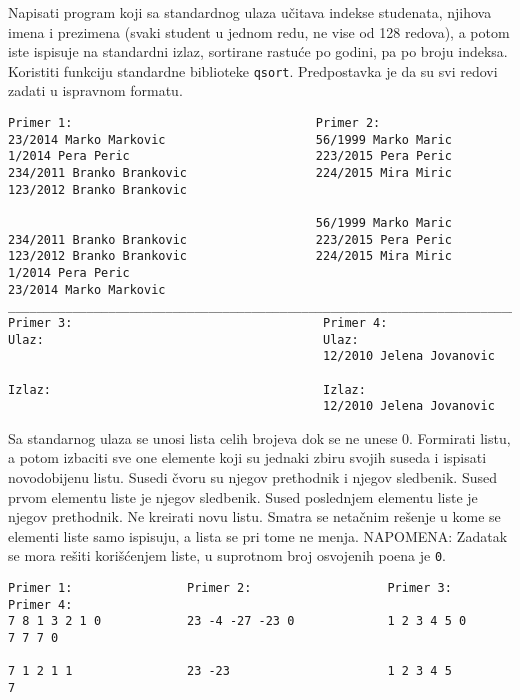 \begin{z}
Napisati program koji sa standardnog ulaza u\v citava indekse studenata,
njihova imena i prezimena (svaki student u jednom redu, ne vise od 128
redova), a potom iste ispisuje na standardni izlaz, sortirane rastu\'ce
po godini, pa po broju indeksa. Koristiti funkciju standardne
biblioteke {\tt qsort}. Predpostavka je da su svi redovi zadati u ispravnom
formatu.
\end{z}
\begin{verbatim}
Primer 1:                                  Primer 2:
23/2014 Marko Markovic                     56/1999 Marko Maric
1/2014 Pera Peric                          223/2015 Pera Peric
234/2011 Branko Brankovic                  224/2015 Mira Miric
123/2012 Branko Brankovic

                                           56/1999 Marko Maric
234/2011 Branko Brankovic                  223/2015 Pera Peric
123/2012 Branko Brankovic                  224/2015 Mira Miric
1/2014 Pera Peric
23/2014 Marko Markovic
________________________________________________________________________________________________
Primer 3:                                   Primer 4:
Ulaz:                                       Ulaz:
                                            12/2010 Jelena Jovanovic

Izlaz:                                      Izlaz:
                                            12/2010 Jelena Jovanovic
\end{verbatim}

\begin{z}
Sa standarnog ulaza se unosi lista celih brojeva dok se ne unese 0. Formirati listu, a potom izbaciti sve one
elemente koji su jednaki zbiru svojih suseda i ispisati novodobijenu listu. Susedi \v cvoru su njegov prethodnik
i njegov sledbenik. Sused prvom elementu liste je njegov sledbenik. Sused poslednjem elementu liste je njegov prethodnik. Ne kreirati novu listu. Smatra se neta\v cnim re\v senje
u kome se elementi liste samo ispisuju, a lista se pri tome ne menja.
NAPOMENA: Zadatak se mora re\v siti kori\v s\'cenjem liste, u suprotnom broj osvojenih poena je {\tt 0}.
\end{z}
\begin{verbatim}
Primer 1:                Primer 2:                   Primer 3:                Primer 4:
7 8 1 3 2 1 0            23 -4 -27 -23 0             1 2 3 4 5 0              7 7 7 0

7 1 2 1 1                23 -23                      1 2 3 4 5                7
\end{verbatim}

